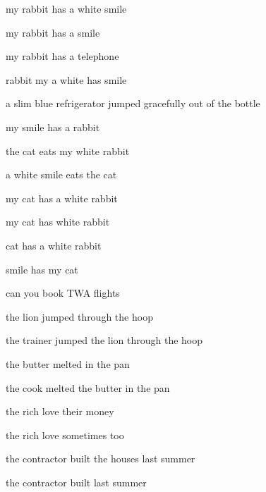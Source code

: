 \scriptsize
my rabbit has a white smile

\par
my rabbit has a smile

\par
my rabbit has a telephone

\par
rabbit my a white has smile

\par
a slim blue refrigerator jumped gracefully out of the bottle

\par
my smile has a rabbit

\par
the cat eats my white rabbit

\par
a white smile eats the cat

\par
my cat has a white rabbit

\par
my cat has white rabbit

\par
cat has a white rabbit

\par
smile has my cat

\par
can you book TWA flights

\par
the lion jumped through the hoop

\par
the trainer jumped the lion through the hoop

\par
the butter melted in the pan

\par
the cook melted the butter in the pan

\par
the rich love their money

\par
the rich love sometimes too

\par
the contractor built the houses last summer

\par
the contractor built last summer

\par
\normalsize
